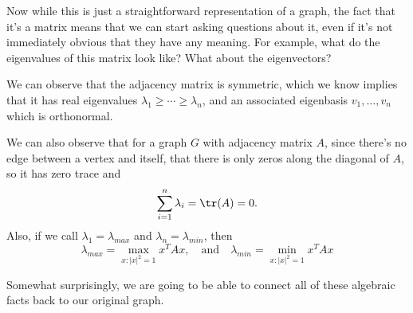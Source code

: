 \documentclass[a4paper]{scrartcl}
\begin{document}
\begin{example}
\begin{center}

	\end{center}
\end{example}

Now while this is just a straightforward representation of a graph, the fact that it's a matrix means that we can start asking questions about it, even if it's not immediately obvious that they have any meaning. For example, what do the eigenvalues of this matrix look like? What about the eigenvectors? 

We can observe that the adjacency matrix is symmetric, which we know implies that it has real eigenvalues $\lambda_1 \geq \cdots \geq \lambda_n$, and an associated eigenbasis $v_1, \dots, v_n$ which is orthonormal.

We can also observe that for a graph $G$ with adjacency matrix $A$, since there's no edge between a vertex and itself, that there is only zeros along the diagonal of $A$, so it has zero trace and
$$
\sum_{i = 1}^n \lambda_i = \tr(A) = 0.
$$
Also, if we call $\lambda_1 = \lambda_{max}$ and $\lambda_n = \lambda_{min}$, then
$$
\lambda_{max} = \max_{x : |x|^2 = 1} x^T A x, \quad \text{and} \quad \lambda_{min} = \min_{x : |x|^2 = 1} x^T A x
$$

Somewhat surprisingly, we are going to be able to connect all of these algebraic facts back to our original graph.
\end{document}
